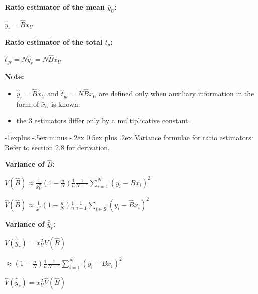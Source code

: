 \documentclass[10pt,landscape]{article}
\makeatletter
\renewcommand{\subsection}{\@startsection{subsection}{2}{0mm}%
                                {-1explus -.5ex minus -.2ex}%
                                {0.5ex plus .2ex}%
                                {\normalfont\normalsize\bfseries}}
\makeatother
\begin{document}
\begin{multicols}{3}
\textbf{Ratio estimator of the mean $\bar{y}_{U}$:}
\begin{center}
  $\hat{\bar{y}}_{r} = \hat{B}\bar{x}_{U}$
\end{center}

\textbf{Ratio estimator of the total $t_{y}$:}
\begin{center}
  $\hat{t}_{yr} = N\hat{\bar{y}}_{r} = N\hat{B}\bar{x}_{U}$
\end{center}

\textbf{Note:}
\begin{itemize}
  \item $\hat{\bar{y}}_{r} = \hat{B}\bar{x}_{U}$ and $\hat{t}_{yr} = N\hat{B}\bar{x}_{U}$ are defined only when auxiliary information in the form of $\bar{x}_{U}$ is known.
  \item the 3 estimators differ only by a multiplicative constant.
\end{itemize}

\subsection{Variance formulae for ratio estimators:}
Refer to section 2.8 for derivation.

\vspace{10}

\textbf{Variance of $\hat{B}$:}

\vspace{5}

$V(\hat{B}) \approx \frac{1}{\bar{x}_{U}^{2}}(1-\frac{n}{N})\frac{1}{n}\frac{1}{N-1}\sum^{N}_{i=1}(y_{i}-Bx_{i})^{2}$

\vspace{5}

$\hat{V}(\hat{B}) \approx \frac{1}{\bar{x}^{2}}(1-\frac{n}{N})\frac{1}{n}\frac{1}{n-1}\sum_{i\in \textbf{S}}(y_{i}-\hat{B}x_{i})^{2}$

\vspace{5}

\textbf{Variance of $\hat{\bar{y}}_{r}$:}

\vspace{5}

$V(\hat{\bar{y}}_{r}) = \bar{x}_{U}^{2}V(\hat{B})$

\hspace{25} $\approx (1-\frac{n}{N})\frac{1}{n}\frac{1}{N-1}\sum^{N}_{i=1}(y_{i}-Bx_{i})^{2}$

\vspace{5}

$\hat{V}(\hat{\bar{y}}_{r}) = \bar{x}_{U}^{2}\hat{V}(\hat{B})$


\end{multicols}
\end{document}
